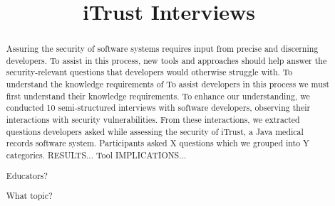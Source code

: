 \documentclass[conference]{IEEEtran}
\begin{document}
%
\title{iTrust Interviews}


\author{
}



\maketitle

\begin{abstract}

Assuring the security of software systems requires input from precise and discerning developers.
To assist in this process, new tools and approaches should help answer the security-relevant questions that developers would otherwise struggle with. 
To understand the knowledge requirements of 
To assist developers in this process we must first understand their knowledge requirements.
To enhance our understanding, we conducted 10 semi-structured interviews with software developers, observing their interactions with security vulnerabilities. 
From these interactions, we extracted questions developers asked while assessing the security of iTrust, a Java medical records software system. 
Participants asked X questions which we grouped into Y categories. RESULTS...
Tool IMPLICATIONS...

Educators?

What topic?

\end{abstract}


%
\IEEEpeerreviewmaketitle
\end{document}
